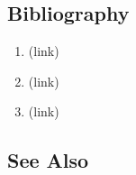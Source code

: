 \subsection*{Bibliography } \begin{enumerate} \item  (link) \href{NIST SP 800-63-3-R3, 2020 }{ } \item  (link) \href{RfC 2828, 2000 }{ } \item  (link) \href{Saltzer and Schroeder, 1975 }{ } \end{enumerate} \subsection*{See Also } 
